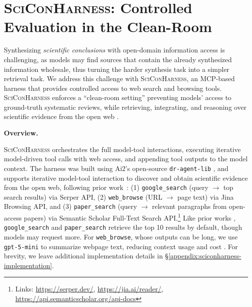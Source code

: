 \documentclass{article}
\newcommand{\xhdr}[1]{%
  \noindent\textbf{#1.}
}
\begin{document}
\section{\textsc{SciConHarness}: Controlled Evaluation in the Clean-Room}\label{sec:clean-room}

Synthesizing \textit{scientific conclusions} with open-domain information access is challenging, as models may find sources that contain the already synthesized information wholesale, thus turning the harder synthesis task into a simpler retrieval task.
We address this challenge with \textsc{SciConHarness}, an MCP-based harness that provides controlled access to web search and browsing tools.
\textsc{SciConHarness} enforces a ``clean-room setting'' preventing models' access to ground-truth systematic reviews, while retrieving, integrating, and reasoning over scientific evidence from the open web \cite{hou2025model}.

\xhdr{Overview}
\textsc{SciConHarness} orchestrates the full model-tool interactions, executing iterative model-driven tool calls with web access, and appending tool outputs to the model context. 
The harness was built using Ai2's open-source \texttt{dr-agent-lib} \cite{shao2025drtulureinforcementlearning}, and supports iterative model-tool interaction to discover and obtain scientific evidence from the open web, following prior work~\cite{gao2025beyond, li2025webweaver, liu2025webexplorer, shao2025drtulureinforcementlearning}: (1) \texttt{google\_search} (query $\rightarrow$ top search results) via Serper API, (2) \texttt{web\_browse} (URL $\rightarrow$ page text) via Jina Browsing API, and (3) \texttt{paper\_search} (query $\rightarrow$ relevant paragraphs from open-access papers) via Semantic Scholar Full-Text Search API.\footnote{Links: \url{https://serper.dev/}, \url{https://jia.ai/reader/}, \url{https://api.semanticscholar.org/api-docs}} Like prior works \cite{shao2025drtulureinforcementlearning}, \texttt{google\_search} and \texttt{paper\_search} retrieve the top 10 results by default, though models may request more. For \texttt{web\_browse}, whose outputs can be long, we use \texttt{gpt-5-mini} to summarize webpage text, reducing context usage and cost \cite{li2025webweaver, shao2025drtulureinforcementlearning}.
For brevity, we leave additional implementation details in \S\ref{appendix:sciconharness-implementation}. 
\end{document}
